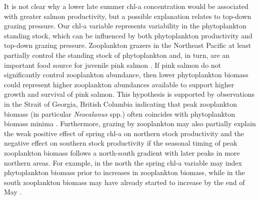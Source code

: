 It is not clear why a lower late summer chl-a concentration would be associated
with greater salmon productivity, but a possible explanation relates to top-down
grazing pressure. Our chl-a variable represents variability in the phytoplankton
standing stock, which can be influenced by both phytoplankton productivity and
top-down grazing pressure.  Zooplankton grazers in the Northeast Pacific at
least partially control the standing stock of phytoplankton \citep{Strom2001,
Frost1987} and, in turn, are an important food source for juvenile pink salmon
\citep{Boldt2003a, Armstrong2005a, Beauchamp2007a}. If pink salmon do not
significantly control zooplankton abundance, then lower phytoplankton biomass
could represent higher zooplankton abundances available to support higher growth
and survival of pink salmon. This hypothesis is supported by observations in the
Strait of Georgia, British Columbia indicating that peak zooplankton biomass (in
particular \emph{Neocalanus} spp.) often coincides with phytoplankton biomass
minima \citep{Bornhold2000}. Furthermore, grazing by zooplankton may also
partially explain the weak positive effect of spring chl-a on northern stock
productivity and the negative effect on southern stock productivity if the
seasonal timing of peak zooplankton biomass follows a north-south gradient with
later peaks in more northern areas. For example, in the north the spring chl-a
variable may index phytoplankton biomass prior to increases in zooplankton
biomass, while in the south zooplankton biomass may have already started to
increase by the end of May \citep{Mackas2012}.

